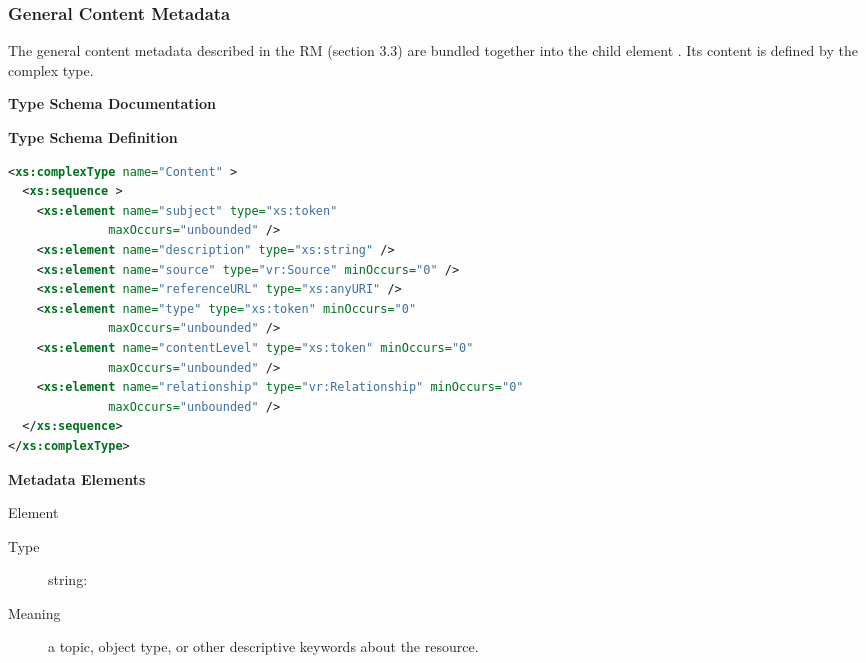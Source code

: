 \documentclass[11pt,a4paper]{ivoa}
\begin{document}



\subsubsection{General Content Metadata}


The general content metadata described in the RM
(section 3.3) are bundled together into the 
child element .  Its content is
defined by the  complex type.


\begin{generated}
\begingroup
      	\renewcommand*\descriptionlabel[1]{%
      	\hbox to 5.5em{\emph{#1}\hfil}}\vspace{2ex}\noindent\textbf{ Type Schema Documentation}


\vspace{1ex}\noindent\textbf{ Type Schema Definition}

\begin{lstlisting}[language=XML,basicstyle=\footnotesize]
<xs:complexType name="Content" >
  <xs:sequence >
    <xs:element name="subject" type="xs:token"
              maxOccurs="unbounded" />
    <xs:element name="description" type="xs:string" />
    <xs:element name="source" type="vr:Source" minOccurs="0" />
    <xs:element name="referenceURL" type="xs:anyURI" />
    <xs:element name="type" type="xs:token" minOccurs="0"
              maxOccurs="unbounded" />
    <xs:element name="contentLevel" type="xs:token" minOccurs="0"
              maxOccurs="unbounded" />
    <xs:element name="relationship" type="vr:Relationship" minOccurs="0"
              maxOccurs="unbounded" />
  </xs:sequence>
</xs:complexType>
\end{lstlisting}

\vspace{0.5ex}\noindent\textbf{ Metadata Elements}

\begingroup\small\begin{bigdescription}\item[Element \xmlel{subject}]
\begin{description}
\item[Type] string: 
\item[Meaning] 
               a topic, object type, or other descriptive keywords 
               about the resource.  
             

\end{description}
\end{bigdescription}
\end{generated}
\end{document}
